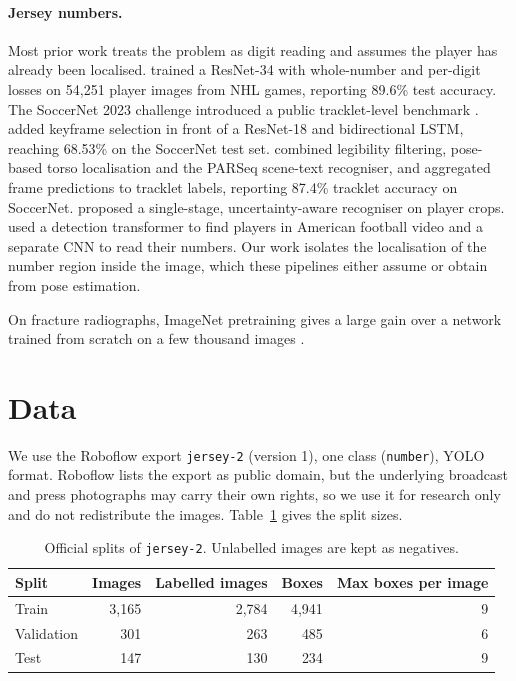 \documentclass[10pt,a4paper]{article}
\begin{document}
\paragraph{Jersey numbers.} Most prior work treats the problem as digit reading and assumes the
player has already been localised. \citet{vats2021multitask} trained a ResNet-34 with
whole-number and per-digit losses on 54,251 player images from NHL games, reporting 89.6\% test
accuracy. The SoccerNet 2023 challenge introduced a public tracklet-level benchmark
\citep{cioppa2024soccernet}. \citet{balaji2023jersey} added keyframe selection in front of a
ResNet-18 and bidirectional LSTM, reaching 68.53\% on the SoccerNet test set.
\citet{koshkina2024general} combined legibility filtering, pose-based torso localisation and the
PARSeq scene-text recogniser, and aggregated frame predictions to tracklet labels, reporting
87.4\% tracklet accuracy on SoccerNet. \citet{grad2025single} proposed a single-stage,
uncertainty-aware recogniser on player crops. \citet{liu2022automated} used a detection
transformer to find players in American football video and a separate CNN to read their numbers.
Our work isolates the localisation of the number region inside the image, which these pipelines
either assume or obtain from pose estimation.

On fracture radiographs, ImageNet pretraining gives a large gain over a network trained from scratch on a few thousand images \citep{hussain2026fracatlas}.

\section{Data}

We use the Roboflow export \texttt{jersey-2} (version 1), one class (\texttt{number}), YOLO format.
Roboflow lists the export as public domain, but the underlying broadcast and press photographs may carry
their own rights, so we use it for research only and do not redistribute the images.
Table~\ref{tab:data} gives the split sizes.

\begin{table}[h]
\centering\small
\caption{Official splits of \texttt{jersey-2}. Unlabelled images are kept as negatives.}
\label{tab:data}
\begin{tabular}{lrrrr}
\toprule
Split & Images & Labelled images & Boxes & Max boxes per image \\
\midrule
Train      & 3,165 & 2,784 & 4,941 & 9 \\
Validation &   301 &   263 &   485 & 6 \\
Test       &   147 &   130 &   234 & 9 \\
\bottomrule
\end{tabular}
\end{table}
\end{document}

